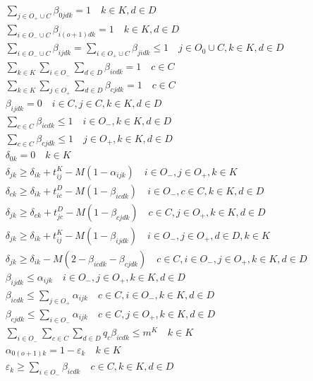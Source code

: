\documentclass[UTF8,11pt]{ctexart}
\begin{document}
\begin{align}
& \sum_{j \in O_{+} \cup C} \beta_{0jdk} = 1 \quad k \in K, d \in D \\
& \sum_{i \in O_{-} \cup C} \beta_{i(o+1)dk} = 1 \quad k \in K, d \in D \\
& \sum_{i \in O_{-} \cup C} \beta_{ijdk} = \sum_{i \in O_{+} \cup C} \beta_{jidk} \le 1 \quad j \in O_{0} \cup C, k \in K, d \in D \\
& \sum_{k \in K} \sum_{i \in O_{-}} \sum_{d \in D} \beta_{icdk} = 1 \quad c \in C \\
& \sum_{k \in K} \sum_{j \in O_{+}} \sum_{d \in D} \beta_{cjdk} = 1 \quad c \in C \\
& \beta_{ijdk} = 0 \quad i \in C, j \in C, k \in K, d \in D \\
& \sum_{c \in C} \beta_{icdk} \le 1 \quad i \in O_{-}, k \in K, d \in D \\
& \sum_{c \in C} \beta_{c j d k} \leq 1 \quad j \in O_{+}, k \in K, d \in D \\
& \delta_{0 k}=0 \quad k \in K \\
& \delta_{j k} \geq \delta_{i k}+t_{i j}^{K}-M(1-\alpha_{i j k}) \quad i \in O_{-}, j \in O_{+}, k \in K \\
& \delta_{c k} \geq \delta_{i k}+t_{i c}^{D}-M(1-\beta_{i c d k}) \quad i \in O_{-}, c \in C, k \in K, d \in D \\
& \delta_{j k} \geq \delta_{c k}+t_{j c}^{D}-M(1-\beta_{c j d k}) \quad c \in C, j \in O_{+}, k \in K, d \in D \\
& \delta_{j k} \geq \delta_{i k}+t_{i j}^{K}-M(1-\beta_{i j d k}) \quad i \in O_{-}, j \in O_{+}, d \in D, k \in K \\
& \delta_{j k} \geq \delta_{i k}-M(2-\beta_{i c d k}-\beta_{c j d k}) \quad c \in C, i \in O_{-}, j \in O_{+}, k \in K, d \in D \\
& \beta_{i j d k} \leq \alpha_{i j k} \quad i \in O_{-}, j \in O_{+}, k \in K, d \in D \\
& \beta_{i c d k} \leq \sum_{j \in O_{+}} \alpha_{i j k} \quad c \in C, i \in O_{-}, k \in K, d \in D \\
& \beta_{c j d k} \leq \sum_{i \in O_{-}} \alpha_{i j k} \quad c \in C, j \in O_{+}, k \in K, d \in D \\
& \sum_{i \in O_{-}} \sum_{c \in C} \sum_{d \in D} q_{c} \beta_{i c d k} \leq m^{K} \quad k \in K \\
& \alpha_{0(o+1) k}=1-\varepsilon_{k} \quad k \in K \\
& \varepsilon_{k} \geq \sum_{i \in O_{-}} \beta_{i c d k} \quad c \in C, k \in K, d \in D \\

\end{align}
\end{document}
